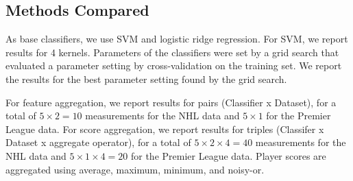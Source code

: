 \documentclass[oribibl]{llncs}%
\begin{document}
%
%
%
%
%

\subsection{Methods Compared} As base classifiers, we use SVM and logistic ridge regression. For SVM, we report results for 4 kernels. Parameters of the classifiers were set by a grid search that evaluated a parameter setting by cross-validation on the training set. We report the results for the best parameter setting found by the grid search.

For feature aggregation, we report results for pairs (Classifier x Dataset), for a total of $ 5 \times 2 = 10$ measurements for the NHL data and $5 \times 1$ for the Premier League data. For score aggregation, we report results for triples (Classifer x Dataset x aggregate operator), for a total of $5 \times 2 \times 4 = 40$ measurements for the NHL data and $5 \times 1 \times 4 = 20$ for the Premier League data. Player scores are aggregated using average, maximum, minimum, and noisy-or.
\end{document}
